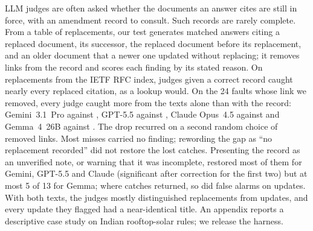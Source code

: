 LLM judges are often asked whether the documents an answer cites are still in force, with an amendment record to
consult. Such records are rarely complete. From a table of replacements, our test generates matched answers citing a replaced document, its
successor, the replaced document before its replacement, and an older document that a newer one updated without
replacing; it removes links from the record and scores each finding by its stated reason. On \ENLinks{}
replacements from the IETF RFC index, judges given a correct record caught nearly every replaced citation, as a lookup would. On the 24 faults whose link we removed, every judge caught more from the texts alone
than with the record: Gemini~3.1~Pro \EGeminiGapTexts{} against \EGeminiGapDamaged, GPT-5.5
\EGPTGapTexts{} against \EGPTGapDamaged, Claude Opus~4.5 \EOpusGapTexts{} against \EOpusGapDamaged{} and Gemma~4~26B
\EGemmaGapTexts{} against \EGemmaGapDamaged. The drop recurred on a second random choice of removed links.
Most misses carried no finding; rewording the gap as ``no replacement recorded'' did not restore
the lost catches. Presenting the record as an unverified note, or warning that it was incomplete, restored most of them
for Gemini, GPT-5.5 and Claude (significant after correction for the first two) but at most 5 of 13 for
Gemma; where catches returned, so did false alarms on updates. With both texts, the judges mostly distinguished replacements from updates,
and every update they flagged had a near-identical title. An appendix reports a descriptive case study on Indian rooftop-solar rules; we
release the harness.
